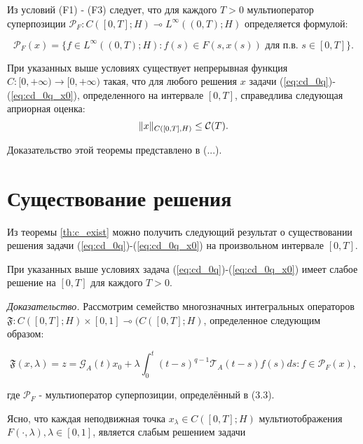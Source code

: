 Из условий (F1) - (F3) следует, что для каждого $T > 0$ мультиоператор суперпозиции
$\mathcal{P}_F: C([0, T]; H) \multimap L^\infty ((0, T); H)$ определяется формулой:

\begin{equation}
    \mathcal{P}_F(x) = \{ f \in L^\infty ((0, T); H): f(s) \in F(s, x(s)) \text{ для п.в. } s \in [0, T] \}.
\end{equation}

\begin{theorem}
    \label{th:c_exist}
    При указанных выше условиях существует непрерывная функция $C: [0, +\infty) \rightarrow [0, +\infty)$ такая,
    что для любого решения $x$ задачи (\ref{eq:cd_0q})-(\ref{eq:cd_0q_x0}), определенного на интервале $[0, T]$,
    справедлива следующая априорная оценка:
    $$\lVert x\rVert_{C([0, T], H)} \leq \mathcal{C}(T).$$
\end{theorem}

\noindent Доказательство этой теоремы представлено в (...).

\section{Существование решения}

Из теоремы \ref{th:c_exist} можно получить следующий результат о существовании решения задачи (\ref{eq:cd_0q})-(\ref{eq:cd_0q_x0}) на произвольном
интервале $[0, T]$.

\begin{theorem}
    При указанных выше условиях задача (\ref{eq:cd_0q})-(\ref{eq:cd_0q_x0}) имеет слабое решение на $[0, T]$ для каждого $T > 0$.
\end{theorem}

\noindent \textit{Доказательство.} Рассмотрим семейство многозначных интегральных операторов
$\mathfrak{F}: C([0, T]; H) \times [0, 1] \multimap (C([0, T]; H)$, определенное следующим образом:

\begin{equation}
    \label{eq:F_xlambda}
    \mathfrak{F}(x, \lambda) = {z = \mathcal{G}_A (t) x_0 + \lambda \int_0^t (t-s)^{q-1} \mathcal{T}_A (t-s) f(s) ds:
    f \in \mathcal{P}_F (x)},
\end{equation}

\noindent где $\mathcal{P}_F$ - мультиоператор суперпозиции, определённый в (3.3).

Ясно, что каждая неподвижная точка $x_{\lambda} \in C([0, T]; H)$ мультиотображения $F (\cdot, \lambda), \lambda \in [0, 1]$,
является слабым решением задачи

